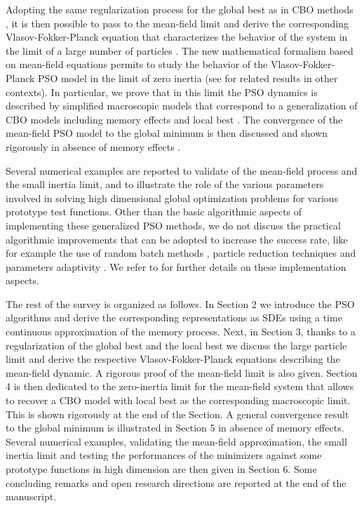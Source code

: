 \documentclass{ims9x6}
\begin{document}
Adopting the same regularization process for the global best as in CBO methods \cite{pinnau2017consensus,carrillo2018analytical}, it is then possible to pass to the mean-field limit and derive the corresponding Vlasov-Fokker-Planck equation that characterizes the behavior of the system in the limit of a large number of particles \cite{Grassi2021PSO,huang2021mean1}. The new mathematical formalism based on mean-field equations permits to study the behavior of the Vlasov-Fokker-Planck PSO model in the limit of zero inertia (see \cite{AS,DLP,sun1,sun2,choi2020quantified,carrillo2021large} for related results in other contexts). In particular, we prove that in this limit the PSO dynamics is described by simplified macroscopic models that correspond to a generalization of CBO models including memory effects and local best \cite{Grassi2021PSO,cipriani2021zero}. The convergence of the mean-field PSO model to the global minimum is then discussed and shown rigorously in absence of memory effects \cite{HJK}.  
 
Several numerical examples are reported to validate of the mean-field process and the small inertia limit, and to illustrate the role of the various parameters involved in solving high dimensional global optimization problems for various prototype test functions.
Other than the basic algorithmic aspects of implementing these generalized PSO methods, we do not discuss the practical algorithmic improvements that can be adopted to increase the success rate, like for example the use of random batch methods \cite{AlPa,carrillo2019consensus,JLJ}, particle reduction techniques \cite{fhps20-2,fornasier2021anisotropic} and parameters adaptivity \cite{poli2007particle,wang2017particle}. We refer to \cite{grassi2021consensus} for further details on these implementation aspects.

The rest of the survey is organized as follows. In Section 2 we introduce the PSO algorithms and derive the corresponding representations as SDEs using a time continuous approximation of the memory process. Next, in Section 3, thanks to a regularization of the global best and the local best we discuss the large particle limit and derive the respective Vlasov-Fokker-Planck equations describing the mean-field dynamic. A rigorous proof of the mean-field limit is also given. 
Section 4 is then dedicated to the zero-inertia limit for the mean-field system that allows to recover a CBO model with local best as the corresponding macroscopic limit. This is shown rigorously at the end of the Section. A general convergence result to the global minimum is illustrated in Section 5 in absence of memory effects.  
Several numerical examples, validating the mean-field approximation, the small inertia limit and testing the performances of the minimizers against some prototype functions in high dimension are then given in Section 6. Some concluding remarks and open research directions are reported at the end of the manuscript. 
\end{document}
